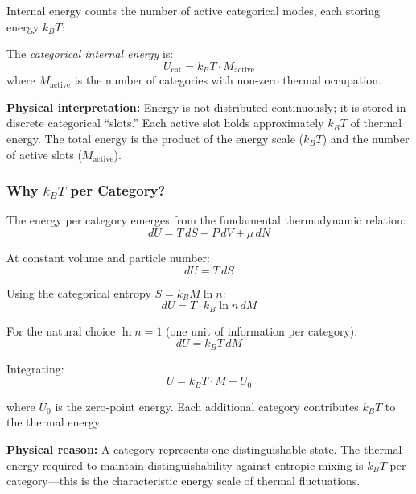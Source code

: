 Internal energy counts the number of active categorical modes, each storing energy $k_B T$:

\begin{definition}
The \textit{categorical internal energy} is:
\begin{equation}
\boxed{U_{\text{cat}} = k_B T \cdot M_{\text{active}}}
\label{eq:categorical_energy}
\end{equation}
where $M_{\text{active}}$ is the number of categories with non-zero thermal occupation.
\end{definition}

\textbf{Physical interpretation:} Energy is not distributed continuously; it is stored in discrete categorical ``slots.'' Each active slot holds approximately $k_B T$ of thermal energy. The total energy is the product of the energy scale ($k_B T$) and the number of active slots ($M_{\text{active}}$).

\subsubsection{Why $k_B T$ per Category?}

The energy per category emerges from the fundamental thermodynamic relation:
\begin{equation}
dU = T \, dS - P \, dV + \mu \, dN
\end{equation}

At constant volume and particle number:
\begin{equation}
dU = T \, dS
\end{equation}

Using the categorical entropy $S = k_B M \ln n$:
\begin{equation}
dU = T \cdot k_B \ln n \, dM
\end{equation}

For the natural choice $\ln n = 1$ (one unit of information per category):
\begin{equation}
dU = k_B T \, dM
\end{equation}

Integrating:
\begin{equation}
U = k_B T \cdot M + U_0
\end{equation}

where $U_0$ is the zero-point energy. Each additional category contributes $k_B T$ to the thermal energy.

\textbf{Physical reason:} A category represents one distinguishable state. The thermal energy required to maintain distinguishability against entropic mixing is $k_B T$ per category—this is the characteristic energy scale of thermal fluctuations.

